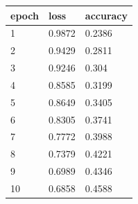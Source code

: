 \begin{tabular}{lll}
\hline
epoch & loss & accuracy \\
\hline
1 & 0.9872 & 0.2386 \\
2 & 0.9429 & 0.2811 \\
3 & 0.9246 & 0.304 \\
4 & 0.8585 & 0.3199 \\
5 & 0.8649 & 0.3405 \\
6 & 0.8305 & 0.3741 \\
7 & 0.7772 & 0.3988 \\
8 & 0.7379 & 0.4221 \\
9 & 0.6989 & 0.4346 \\
10 & 0.6858 & 0.4588 \\
\hline
\end{tabular}
